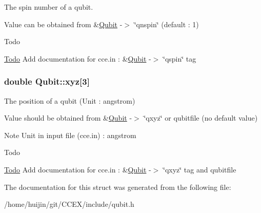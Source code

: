 The spin number of a qubit. 

Value can be obtained from \&\hyperlink{structQubit}{Qubit} -\/$>$ \char`\"{}qnspin\char`\"{} (default \-: 1) \begin{DoxyRefDesc}{Todo}
\item[\hyperlink{todo__todo000016}{Todo}]Add documentation for cce.\-in \-: \&\hyperlink{structQubit}{Qubit} -\/$>$ \char`\"{}qspin\char`\"{} tag \end{DoxyRefDesc}
\hypertarget{structQubit_a799cb32b473160eb8e9e4aa6c9c39b18}{
\subsubsection[{xyz}]{\setlength{\rightskip}{0pt plus 5cm}double Qubit\-::xyz\mbox{[}3\mbox{]}}}\label{structQubit_a799cb32b473160eb8e9e4aa6c9c39b18}


The position of a qubit (Unit \-: angstrom) 

Value should be obtained from \&\hyperlink{structQubit}{Qubit} -\/$>$ \char`\"{}qxyz\char`\"{} or qubitfile (no default value) \begin{DoxyNote}{Note}
Unit in input file (cce.\-in) \-: angstrom 
\end{DoxyNote}
\begin{DoxyRefDesc}{Todo}
\item[\hyperlink{todo__todo000018}{Todo}]Add documentation for cce.\-in \-: \&\hyperlink{structQubit}{Qubit} -\/$>$ \char`\"{}qxyz\char`\"{} tag and qubitfile \end{DoxyRefDesc}


The documentation for this struct was generated from the following file\-:\begin{DoxyCompactItemize}
\item 
/home/huijin/git/\-C\-C\-E\-X/include/qubit.\-h\end{DoxyCompactItemize}
